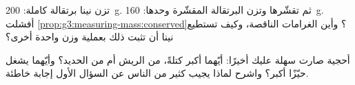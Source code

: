 \begin{exercise}[$\star\star$]\label{exo:g3:measuring-mass:10}
تزن نينا برتقالة كاملة: \qty{200}{g}. ثم تقشّرها وتزن البرتقالة
المقشّرة وحدها: \qty{160}{g}. أفشلت
\cref{prop:g3:measuring-mass:conserved}؟ وأين الغرامات
الناقصة، وكيف تستطيع نينا أن تثبت ذلك بعملية وزن واحدة أخرى؟
\end{exercise}

\begin{exercise}[$\star\star$]\label{exo:g3:measuring-mass:11}
أحجية صارت سهلة عليك أخيرًا: أيّهما أكبر كتلةً،  من
الريش أم  من الحديد؟ وأيّهما يشغل حيّزًا أكبر؟ واشرح
لماذا يجيب كثير من الناس عن السؤال الأول إجابة خاطئة.
\end{exercise}
